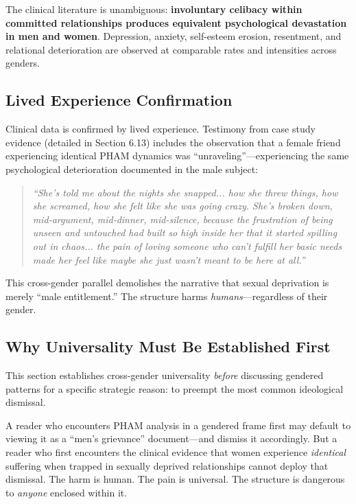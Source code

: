 \documentclass[12pt,openany]{book}
\numberwithin{equation}{chapter}
\begin{document}
The clinical literature is unambiguous: \textbf{involuntary celibacy within committed relationships produces equivalent psychological devastation in men and women}. Depression, anxiety, self-esteem erosion, resentment, and relational deterioration are observed at comparable rates and intensities across genders.

\subsection{Lived Experience Confirmation}

Clinical data is confirmed by lived experience. Testimony from case study evidence (detailed in Section 6.13) includes the observation that a female friend experiencing identical PHAM dynamics was ``unraveling''---experiencing the same psychological deterioration documented in the male subject:

\begin{quote}
\textit{``She's told me about the nights she snapped... how she threw things, how she screamed, how she felt like she was going crazy. She's broken down, mid-argument, mid-dinner, mid-silence, because the frustration of being unseen and untouched had built so high inside her that it started spilling out in chaos... the pain of loving someone who can't fulfill her basic needs made her feel like maybe she just wasn't meant to be here at all.''}
\end{quote}

This cross-gender parallel demolishes the narrative that sexual deprivation is merely ``male entitlement.'' The structure harms \textit{humans}---regardless of their gender.

\subsection{Why Universality Must Be Established First}

This section establishes cross-gender universality \textit{before} discussing gendered patterns for a specific strategic reason: to preempt the most common ideological dismissal.

A reader who encounters PHAM analysis in a gendered frame first may default to viewing it as a ``men's grievance'' document---and dismiss it accordingly. But a reader who first encounters the clinical evidence that women experience \textit{identical} suffering when trapped in sexually deprived relationships cannot deploy that dismissal. The harm is human. The pain is universal. The structure is dangerous to \textit{anyone} enclosed within it.
\end{document}
